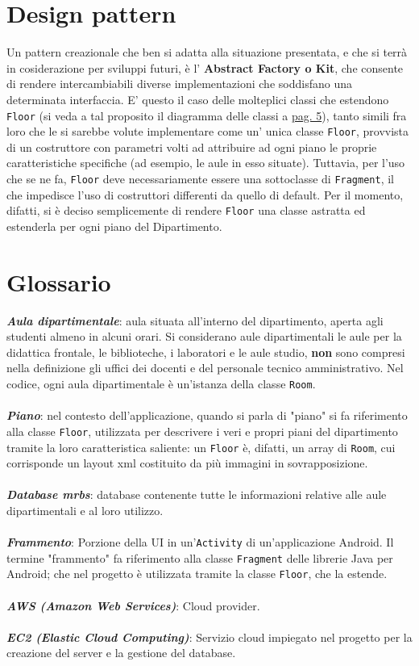 \documentclass{article}
\def\code#1{\texttt{#1}}
\begin{document}
	\newpage
	\part{Design pattern} %
	Un pattern creazionale che ben si adatta alla situazione presentata, e che si terrà in cosiderazione per sviluppi futuri, è l' \textbf{Abstract Factory o Kit}, che consente di rendere intercambiabili diverse implementazioni che soddisfano una determinata interfaccia. E' questo il caso delle molteplici classi che estendono \code{Floor} (si veda a tal proposito il diagramma delle classi a \hyperlink{page.5}{pag. 5}), tanto simili fra loro che le si sarebbe volute implementare come un' unica classe \code{Floor}, provvista di un costruttore con parametri volti ad attribuire ad ogni piano le proprie caratteristiche specifiche (ad esempio, le aule in esso situate). Tuttavia, per l'uso che se ne fa, \code{Floor} deve necessariamente essere una sottoclasse di \code{Fragment}, il che impedisce l'uso di costruttori differenti da quello di default. Per il momento, difatti, si è deciso semplicemente di rendere \code{Floor} una classe astratta ed estenderla per ogni piano del Dipartimento.
	\newpage
	\appendix
	\part{Glossario}
	\textit{\textbf{Aula dipartimentale}}: aula situata all'interno del dipartimento, aperta agli studenti almeno in alcuni orari. Si considerano aule dipartimentali le aule per la didattica frontale, le biblioteche, i laboratori e le aule studio, \textbf{non} sono compresi nella definizione gli uffici dei docenti e del personale tecnico amministrativo. Nel codice, ogni aula dipartimentale è un'istanza della classe \code{Room}.\\\\
	\textit{\textbf{Piano}}: nel contesto dell'applicazione, quando si parla di "piano" si fa riferimento alla classe \code{Floor}, utilizzata per descrivere i veri e propri piani del dipartimento tramite la loro caratteristica saliente: un \code{Floor} è, difatti, un array di \code{Room}, cui corrisponde un layout xml costituito da più immagini in sovrapposizione.\\\\
	\textit{\textbf{Database mrbs}}: database contenente tutte le informazioni relative alle aule dipartimentali e al loro utilizzo.\\\\
	\textit{\textbf{Frammento}}: Porzione della UI in un'\code{Activity} di un'applicazione Android. Il termine "frammento" fa riferimento alla classe \code{Fragment} delle librerie Java per Android; che nel progetto è utilizzata tramite la classe \code{Floor}, che la estende.\\\\
	\textit{\textbf{AWS (Amazon Web Services)}}: Cloud provider.\\\\
	\textit{\textbf{EC2 (Elastic Cloud Computing)}}: Servizio cloud impiegato nel progetto per la creazione del server e la gestione del database.
\end{document}

